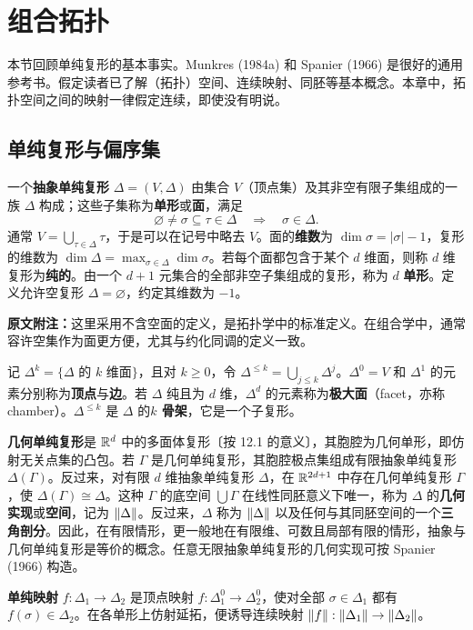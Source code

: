 \section{组合拓扑}
本节回顾单纯复形的基本事实。Munkres (1984a) 和 Spanier (1966) 是很好的通用参考书。假定读者已了解（拓扑）空间、连续映射、同胚等基本概念。本章中，拓扑空间之间的映射一律假定连续，即使没有明说。
\subsection*{单纯复形与偏序集}
一个\textbf{抽象单纯复形} $\Delta=(V,\Delta)$ 由集合 $V$（顶点集）及其非空有限子集组成的一族 $\Delta$ 构成；这些子集称为\textbf{单形}或\textbf{面}，满足
\[
\varnothing\ne\sigma\subseteq\tau\in\Delta\quad\Longrightarrow\quad\sigma\in\Delta.
\]
通常 $V=\bigcup_{\tau\in\Delta}\tau$，于是可以在记号中略去 $V$。面的\textbf{维数}为 $\dim\sigma=|\sigma|-1$，复形的维数为 $\dim\Delta=\max_{\sigma\in\Delta}\dim\sigma$。若每个面都包含于某个 $d$ 维面，则称 $d$ 维复形为\textbf{纯的}。由一个 $d+1$ 元集合的全部非空子集组成的复形，称为 $d$ \textbf{单形}。定义允许空复形 $\Delta=\varnothing$，约定其维数为 $-1$。

\textbf{原文附注：}这里采用不含空面的定义，是拓扑学中的标准定义。在组合学中，通常容许空集作为面更方便，尤其与约化同调的定义一致。

记 $\Delta^k=\{\Delta\text{ 的 }k\text{ 维面}\}$，且对 $k\ge0$，令 $\Delta^{\le k}=\bigcup_{j\le k}\Delta^j$。$\Delta^0=V$ 和 $\Delta^1$ 的元素分别称为\textbf{顶点}与\textbf{边}。若 $\Delta$ 纯且为 $d$ 维，$\Delta^d$ 的元素称为\textbf{极大面}（facet，亦称 chamber）。$\Delta^{\le k}$ 是 $\Delta$ 的\textbf{$k$ 骨架}，它是一个子复形。

\textbf{几何单纯复形}是 $\mathbb R^d$ 中的多面体复形〔按 12.1 的意义〕，其胞腔为几何单形，即仿射无关点集的凸包。若 $\Gamma$ 是几何单纯复形，其胞腔极点集组成有限抽象单纯复形 $\Delta(\Gamma)$。反过来，对有限 $d$ 维抽象单纯复形 $\Delta$，在 $\mathbb R^{2d+1}$ 中存在几何单纯复形 $\Gamma$，使 $\Delta(\Gamma)\cong\Delta$。这种 $\Gamma$ 的底空间 $\bigcup\Gamma$ 在线性同胚意义下唯一，称为 $\Delta$ 的\textbf{几何实现}或\textbf{空间}，记为 $\lVert\Delta\rVert$。反过来，$\Delta$ 称为 $\lVert\Delta\rVert$ 以及任何与其同胚空间的一个\textbf{三角剖分}。因此，在有限情形，更一般地在有限维、可数且局部有限的情形，抽象与几何单纯复形是等价的概念。任意无限抽象单纯复形的几何实现可按 Spanier (1966) 构造。

\textbf{单纯映射} $f:\Delta_1\to\Delta_2$ 是顶点映射 $f:\Delta_1^0\to\Delta_2^0$，使对全部 $\sigma\in\Delta_1$ 都有 $f(\sigma)\in\Delta_2$。在各单形上仿射延拓，便诱导连续映射 $\lVert f\rVert:\lVert\Delta_1\rVert\to\lVert\Delta_2\rVert$。


